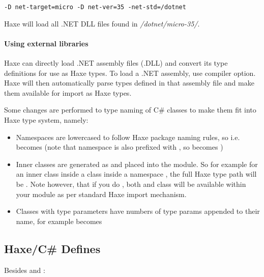 \begin{lstlisting}
-D net-target=micro -D net-ver=35 -net-std=/dotnet
\end{lstlisting}

Haxe will load all .NET DLL files found in \emph{/dotnet/micro-35/}.


\paragraph{Using external libraries}

Haxe can directly load .NET assembly files (.DLL) and convert its type definitions for use as Haxe types. To load a .NET assembly, use  compiler option. Haxe will then automatically parse types defined in that assembly file and make them available for import as Haxe types.

Some changes are performed to type naming of C# classes to make them fit into Haxe type system, namely:

\begin{itemize}
	\item Namespaces are lowercased to follow Haxe package naming rules, so i.e.  becomes  (note that  namespace is also prefixed with , so   becomes  )
	\item Inner classes are generated as  and placed into the  module. So for example for an inner class  inside a class  inside a namespace , the full Haxe type path will be . Note however, that if you do , both  and  class will be available within your module as per standard Haxe import mechanism.
	\item Classes with type parameters have numbers of type params appended to their name, for example  becomes 
\end{itemize}


\subsection{Haxe/C# Defines}
\label{target-cs-defines}

Besides  and :

